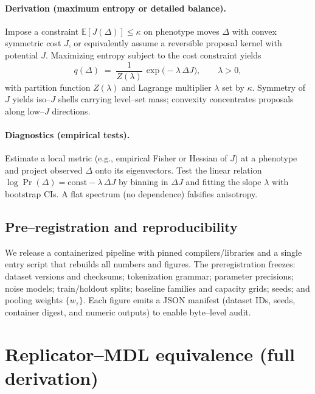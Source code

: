 \documentclass[11pt,a4paper]{article}
\newcommand{\E}{\mathbb{E}}
\begin{document}
\paragraph{Derivation (maximum entropy or detailed balance).}
Impose a constraint $\E[J(\Delta)]\le \kappa$ on phenotype moves $\Delta$ with convex symmetric cost $J$, or equivalently assume a reversible proposal kernel with potential $J$. Maximizing entropy subject to the cost constraint yields
\[
q(\Delta) \;=\; \frac{1}{Z(\lambda)}\,\exp\!\big(-\lambda\,\Delta J\big),\qquad \lambda>0,
\]
with partition function $Z(\lambda)$ and Lagrange multiplier $\lambda$ set by $\kappa$. Symmetry of $J$ yields iso–$J$ shells carrying level–set mass; convexity concentrates proposals along low–$J$ directions.

\paragraph{Diagnostics (empirical tests).}
Estimate a local metric (e.g., empirical Fisher or Hessian of $J$) at a phenotype and project observed $\Delta$ onto its eigenvectors. Test the linear relation $\log \Pr(\Delta) = \text{const} - \lambda\,\Delta J$ by binning in $\Delta J$ and fitting the slope $\lambda$ with bootstrap CIs. A flat spectrum (no dependence) falsifies anisotropy.

\subsection{Pre–registration and reproducibility}
We release a containerized pipeline with pinned compilers/libraries and a single entry script that rebuilds all numbers and figures. The preregistration freezes: dataset versions and checksums; tokenization grammar; parameter precisions; noise models; train/holdout splits; baseline families and capacity grids; seeds; and pooling weights $\{w_\tau\}$. Each figure emits a JSON manifest (dataset IDs, seeds, container digest, and numeric outputs) to enable byte–level audit.

\appendix

\section{Replicator--MDL equivalence (full derivation)}
\label{app:replicator-mdl}
\end{document}
